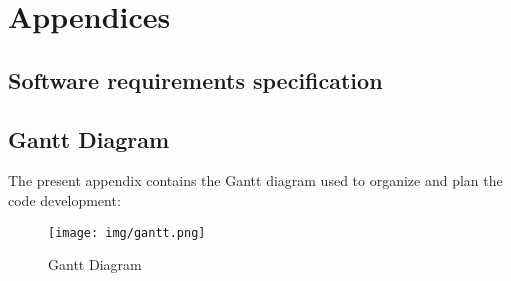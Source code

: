 \part{Appendices}

\chapter{Software requirements specification}
	


\chapter{Gantt Diagram}
The present appendix contains the Gantt diagram used to organize and plan the code development:
\begin{figure}[h]
	\centering
    \texttt{[image: img/gantt.png]}
	\caption[Gantt Diagram]{Gantt Diagram}	
\end{figure}
